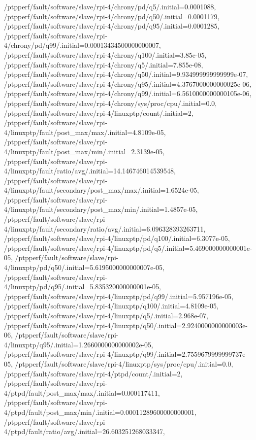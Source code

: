 {    /ptpperf/fault/software/slave/rpi-4/chrony/pd/q5/.initial=0.0001088,
    /ptpperf/fault/software/slave/rpi-4/chrony/pd/q50/.initial=0.0001179,
    /ptpperf/fault/software/slave/rpi-4/chrony/pd/q95/.initial=0.0001285,
    /ptpperf/fault/software/slave/rpi-4/chrony/pd/q99/.initial=0.00013434500000000007,
    /ptpperf/fault/software/slave/rpi-4/chrony/q100/.initial=3.85e-05,
    /ptpperf/fault/software/slave/rpi-4/chrony/q5/.initial=7.855e-08,
    /ptpperf/fault/software/slave/rpi-4/chrony/q50/.initial=9.934999999999999e-07,
    /ptpperf/fault/software/slave/rpi-4/chrony/q95/.initial=4.3767000000000025e-06,
    /ptpperf/fault/software/slave/rpi-4/chrony/q99/.initial=6.5610000000000105e-06,
    /ptpperf/fault/software/slave/rpi-4/chrony/sys/proc/cpu/.initial=0.0,
    /ptpperf/fault/software/slave/rpi-4/linuxptp/count/.initial=2,
    /ptpperf/fault/software/slave/rpi-4/linuxptp/fault/post_max/max/.initial=4.8109e-05,
    /ptpperf/fault/software/slave/rpi-4/linuxptp/fault/post_max/min/.initial=2.3139e-05,
    /ptpperf/fault/software/slave/rpi-4/linuxptp/fault/ratio/avg/.initial=14.146746014539548,
    /ptpperf/fault/software/slave/rpi-4/linuxptp/fault/secondary/post_max/max/.initial=1.6524e-05,
    /ptpperf/fault/software/slave/rpi-4/linuxptp/fault/secondary/post_max/min/.initial=1.4857e-05,
    /ptpperf/fault/software/slave/rpi-4/linuxptp/fault/secondary/ratio/avg/.initial=6.096328393263711,
    /ptpperf/fault/software/slave/rpi-4/linuxptp/pd/q100/.initial=6.3077e-05,
    /ptpperf/fault/software/slave/rpi-4/linuxptp/pd/q5/.initial=5.469000000000001e-05,
    /ptpperf/fault/software/slave/rpi-4/linuxptp/pd/q50/.initial=5.6195000000000007e-05,
    /ptpperf/fault/software/slave/rpi-4/linuxptp/pd/q95/.initial=5.835320000000001e-05,
    /ptpperf/fault/software/slave/rpi-4/linuxptp/pd/q99/.initial=5.957196e-05,
    /ptpperf/fault/software/slave/rpi-4/linuxptp/q100/.initial=4.8109e-05,
    /ptpperf/fault/software/slave/rpi-4/linuxptp/q5/.initial=2.968e-07,
    /ptpperf/fault/software/slave/rpi-4/linuxptp/q50/.initial=2.9240000000000003e-06,
    /ptpperf/fault/software/slave/rpi-4/linuxptp/q95/.initial=1.2660000000000002e-05,
    /ptpperf/fault/software/slave/rpi-4/linuxptp/q99/.initial=2.7559679999999737e-05,
    /ptpperf/fault/software/slave/rpi-4/linuxptp/sys/proc/cpu/.initial=0.0,
    /ptpperf/fault/software/slave/rpi-4/ptpd/count/.initial=2,
    /ptpperf/fault/software/slave/rpi-4/ptpd/fault/post_max/max/.initial=0.000117411,
    /ptpperf/fault/software/slave/rpi-4/ptpd/fault/post_max/min/.initial=0.00011289600000000001,
    /ptpperf/fault/software/slave/rpi-4/ptpd/fault/ratio/avg/.initial=26.603251268033347,
}
